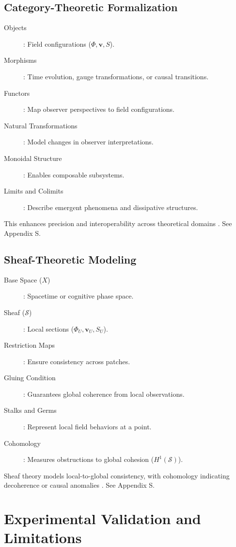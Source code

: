\documentclass[12pt]{report}
\newcommand{\PhiRSVP}{\Phi}
\newcommand{\vRSVP}{\mathbf{v}}
\newcommand{\SRSVP}{S}
\begin{document}
\section{Category-Theoretic Formalization}
\begin{description}
    \item[Objects]: Field configurations (\(\PhiRSVP, \vRSVP, \SRSVP\)).
    \item[Morphisms]: Time evolution, gauge transformations, or causal transitions.
    \item[Functors]: Map observer perspectives to field configurations.
    \item[Natural Transformations]: Model changes in observer interpretations.
    \item[Monoidal Structure]: Enables composable subsystems.
    \item[Limits and Colimits]: Describe emergent phenomena and dissipative structures.
\end{description}
This enhances precision and interoperability across theoretical domains \citep{Lurie2009}. See Appendix S.

\section{Sheaf-Theoretic Modeling}
\begin{description}
    \item[Base Space (\(X\))]: Spacetime or cognitive phase space.
    \item[Sheaf (\(\mathcal{S}\))]: Local sections (\(\PhiRSVP_U, \vRSVP_U, \SRSVP_U\)).
    \item[Restriction Maps]: Ensure consistency across patches.
    \item[Gluing Condition]: Guarantees global coherence from local observations.
    \item[Stalks and Germs]: Represent local field behaviors at a point.
    \item[Cohomology]: Measures obstructions to global cohesion (\(H^1(\mathcal{S})\)).
\end{description}
Sheaf theory models local-to-global consistency, with cohomology indicating decoherence or causal anomalies \citep{Bredon1997}. See Appendix S.

\chapter{Experimental Validation and Limitations}
\end{document}
